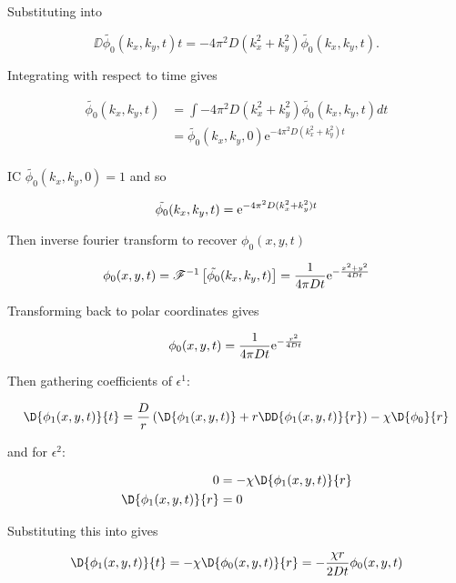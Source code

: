 Substituting into 

\begin{equation}
  \DD{\tilde{\phi_0}(k_x,k_y,t)}{t} = -4\pi^2D (k_x^2 + k_y^2) \tilde{\phi_0}(k_x,k_y,t).
\end{equation}

Integrating with respect to time gives

\begin{equation}
\begin{split}
  \tilde{\phi_0}(k_x,k_y,t) &= \int -4\pi^2D (k_x^2 + k_y^2) \tilde{\phi_0}(k_x,k_y,t) dt \\
  &= \tilde{\phi_0}(k_x,k_y,0)\mathrm{e}^{-4\pi^2D(k_x^2 + k_y^2)t} \\
\end{split}
\end{equation}

IC $ \tilde{\phi_0}(k_x,k_y,0) = 1$ and so

\begin{equation}
  \tilde{\phi_0}(k_x,k_y,t) = \mathrm{e}^{-4\pi^2D(k_x^2 + k_y^2)t} \\
\end{equation}

Then inverse fourier transform to recover $\phi_0(x,y,t)$

\begin{equation}
  \phi_0(x,y,t) = \mathscr{F}^{-1}\left[\tilde{\phi_0}(k_x,k_y,t)\right] = \frac{1}{4\pi Dt}\mathrm{e}^{-\frac{x^2 + y^2}{4Dt}} \\
\end{equation}

Transforming back to polar coordinates gives

\begin{equation}
  \phi_0(x,y,t) = \frac{1}{4\pi Dt}\mathrm{e}^{-\frac{r^2}{4Dt}} \\
  \label{eqn:phi_0}
\end{equation}

Then gathering coefficients of $\epsilon^1$:

\begin{equation}
\D{\phi_1(x,y,t)}{t} = \frac{D}{r}\left(\D{\phi_1(x,y,t)} + r \DD{\phi_1(x,y,t)}{r}\right) - \chi\D{\phi_0}{r}
\label{eqn:eps1}
\end{equation}

and for $\epsilon^2$:

\begin{equation}
\begin{split}
0 &= -\chi\D{\phi_1(x,y,t)}{r} \\
\D{\phi_1(x,y,t)}{r} &= 0
\end{split}
\end{equation}

Substituting this into  gives

\begin{equation}
  \D{\phi_1(x,y,t)}{t} = - \chi\D{\phi_0(x,y,t)}{r} = - \frac{\chi r}{2Dt} \phi_0(x,y,t)
\end{equation}

